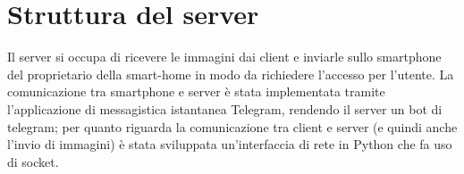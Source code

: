 \section{Struttura del server}
Il server si occupa di ricevere le immagini dai client e inviarle sullo smartphone del proprietario della smart-home in modo da richiedere l'accesso per l'utente. La comunicazione tra smartphone e server è stata implementata tramite l'applicazione di messagistica istantanea Telegram, rendendo il server un bot di telegram; per quanto riguarda la comunicazione  tra client e server (e quindi anche l'invio di immagini) è stata sviluppata un'interfaccia di rete in Python che fa uso di socket.
















